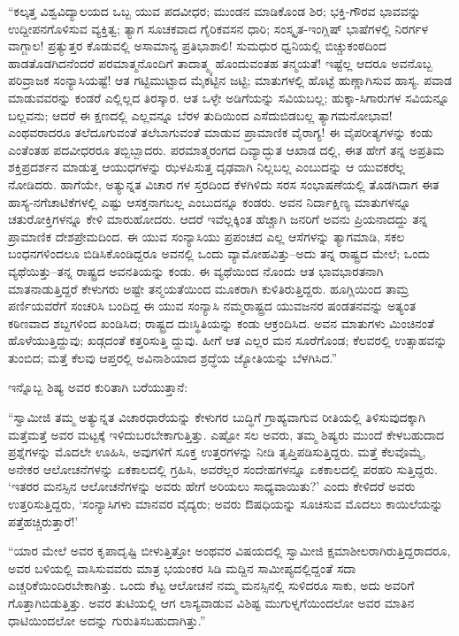 “ಕಲ್ಕತ್ತ ವಿಶ್ವವಿದ್ಯಾಲಯದ ಒಬ್ಬ ಯುವ ಪದವೀಧರ; ಮುಂಡನ ಮಾಡಿಕೊಂಡ ಶಿರ; ಭಕ್ತಿ-ಗೌರವ ಭಾವವನ್ನು ಉದ್ದೀಪನಗೊಳಿಸುವ ವ್ಯಕ್ತಿತ್ವ; ತ್ಯಾಗ ಸೂಚಕವಾದ ಗೈರಿಕವಸನ ಧಾರಿ; ಸಂಸ್ಕೃತ-ಇಂಗ್ಲಿಷ್ ಭಾಷೆಗಳಲ್ಲಿ ನಿರರ್ಗಳ ವಾಗ್ಜಾಲ! ಪ್ರತ್ಯುತ್ತರ ಕೊಡುವಲ್ಲಿ ಅಸಾಮಾನ್ಯ ಪ್ರತಿಭಾಶಾಲಿ! ಸುಮಧುರ ಧ್ವನಿಯಲ್ಲಿ ಬಿಚ್ಚುಕಂಠದಿಂದ ಹಾಡತೊಡಗಿದನೆಂದರೆ ಪರಮಾತ್ಮನೊಂದಿಗೆ ತಾದಾತ್ಮ್ಯ ಹೊಂದುವಂತಹ ತನ್ಮಯತೆ! ಇಷ್ಟೆಲ್ಲ ಆದರೂ ಅವನೊಬ್ಬ ಪರಿವ್ರಾಜಕ ಸಂನ್ಯಾಸಿಯಷ್ಟೆ! ಆತ ಗಟ್ಟಿಮುಟ್ಟಾದ ಮೈಕಟ್ಟಿನ ಜಟ್ಟಿ; ಮಾತುಗಳಲ್ಲಿ ಹೊಟ್ಟೆ ಹುಣ್ಣಾಗಿಸುವ ಹಾಸ್ಯ. ಪವಾಡ ಮಾಡುವವರನ್ನು ಕಂಡರೆ ಎಲ್ಲಿಲ್ಲದ ತಿರಸ್ಕಾರ. ಆತ ಒಳ್ಳೇ ಅಡಿಗೆಯನ್ನು ಸವಿಯಬಲ್ಲ; ಹುಕ್ಕಾ-ಸಿಗಾರುಗಳ ಸವಿಯನ್ನೂ ಬಲ್ಲವನು; ಆದರೆ ಈ ಕ್ಷಣದಲ್ಲಿ ಎಲ್ಲವನ್ನೂ ಬೆರಳ ತುದಿಯಿಂದ ಎಸೆದುಬಿಡಬಲ್ಲ ತ್ಯಾಗಮನೋಭಾವ! ಎಂಥವರಾದರೂ ತಲೆದೂಗುವಂತೆ ತಲೆಬಾಗುವಂತೆ ಮಾಡುವ ಪ್ರಾಮಾಣಿಕ ವೈರಾಗ್ಯ! ಈ ವೈಪರೀತ್ಯಗಳನ್ನು ಕಂಡು ಎಂತೆಂತಹ ಪದವೀಧರರೂ ತಬ್ಬಿಬ್ಬಾದರು. ಪರಮಾತ್ಮರಂಗದ ದಿವ್ಯಾದ್ಭುತ ಆಖಾಡ ದಲ್ಲಿ, ಈತ ಹೇಗೆ ತನ್ನ ಅಪ್ರತಿಮ ಶಕ್ತಿಪ್ರದರ್ಶನ ಮಾಡುತ್ತ ಆಯುಧಗಳನ್ನು ಝಳಪಿಸುತ್ತ ದೃಢವಾಗಿ ನಿಲ್ಲಬಲ್ಲ ಎಂಬುದನ್ನು ಆ ಯುವಕರೆಲ್ಲ ನೋಡಿದರು. ಹಾಗೆಯೇ, ಅತ್ಯುನ್ನತ ವಿಚಾರ ಗಳ ಸ್ತರದಿಂದ ಕೆಳಗಿಳಿದು ಸರಸ ಸಂಭಾಷಣೆಯಲ್ಲಿ ತೊಡಗಿದಾಗ ಈತ ಹಾಸ್ಯ-ನಗೆಚಾಟಿಕೆಗಳಲ್ಲಿ ಎಷ್ಟು ಆಸಕ್ತನಾಗಬಲ್ಲ ಎಂಬುದನ್ನೂ ಕಂಡರು. ಅವನ ನಿರ್ದಾಕ್ಷಿಣ್ಯ ಮಾತುಗಳನ್ನೂ ಚತುರೋಕ್ತಿಗಳನ್ನೂ ಕೇಳಿ ಮಾರುಹೋದರು. ಆದರೆ ಇವೆಲ್ಲಕ್ಕಿಂತ ಹೆಚ್ಚಾಗಿ ಜನರಿಗೆ ಅವನು ಪ್ರಿಯನಾದದ್ದು ತನ್ನ ಪ್ರಾಮಾಣಿಕ ದೇಶಪ್ರೇಮದಿಂದ. ಈ ಯುವ ಸಂನ್ಯಾಸಿಯು ಪ್ರಪಂಚದ ಎಲ್ಲ ಆಸೆಗಳನ್ನು ತ್ಯಾಗಮಾಡಿ, ಸಕಲ ಬಂಧನಗಳಿಂದಲೂ ಬಿಡಿಸಿಕೊಂಡಿದ್ದರೂ ಅವನಲ್ಲಿ ಒಂದು ವ್ಯಾಮೋಹವಿತ್ತು–ಅದು ತನ್ನ ರಾಷ್ಟ್ರದ ಮೇಲೆ; ಒಂದು ವ್ಯಥೆಯಿತ್ತು–ತನ್ನ ರಾಷ್ಟ್ರದ ಅವನತಿಯನ್ನು ಕಂಡು. ಈ ವ್ಯಥೆಯಿಂದ ನೊಂದು ಆತ ಭಾವಭಾರತನಾಗಿ ಮಾತನಾಡುತ್ತಿದ್ದರೆ ಕೇಳುಗರು ಅಷ್ಟೇ ತನ್ಮಯತೆಯಿಂದ ಮೂಕರಾಗಿ ಕುಳಿತಿರುತ್ತಿದ್ದರು. ಹೂಗ್ಲಿಯಿಂದ ತಾಮ್ರ ಪರ್ಣಿಯವರೆಗೆ ಸಂಚರಿಸಿ ಬಂದಿದ್ದ ಈ ಯುವ ಸಂನ್ಯಾಸಿ ನಮ್ಮರಾಷ್ಟ್ರದ ಯುವಜನರ ಷಂಡತನವನ್ನು ಅತ್ಯಂತ ಕಠಿಣವಾದ ಶಬ್ದಗಳಿಂದ ಖಂಡಿಸಿದ; ರಾಷ್ಟ್ರದ ದುಃಸ್ಥಿತಿಯನ್ನು ಕಂಡು ಆಕ್ರಂದಿಸಿದ. ಅವನ ಮಾತುಗಳು ಮಿಂಚಿನಂತೆ ಹೊಳೆಯುತ್ತಿದ್ದುವು; ಖಡ್ಗದಂತೆ ಕತ್ತರಿಸುತ್ತಿ ದ್ದುವು. ಹೀಗೆ ಆತ ಎಲ್ಲರ ಮನ ಸೂರೆಗೊಂಡ; ಕೆಲವರಲ್ಲಿ ಉತ್ಸಾಹವನ್ನು ತುಂಬಿದ; ಮತ್ತೆ ಕೆಲವು ಆಪ್ತರಲ್ಲಿ ಅವಿನಾಶಿಯಾದ ಶ್ರದ್ಧೆಯ ಜ್ಯೋತಿಯನ್ನು ಬೆಳಗಿಸಿದ.”

ಇನ್ನೊಬ್ಬ ಶಿಷ್ಯ ಅವರ ಕುರಿತಾಗಿ ಬರೆಯುತ್ತಾನೆ:

“ಸ್ವಾಮೀಜಿ ತಮ್ಮ ಅತ್ಯುನ್ನತ ವಿಚಾರಧಾರೆಯನ್ನು ಕೇಳುಗರ ಬುದ್ಧಿಗೆ ಗ್ರಾಹ್ಯವಾಗುವ ರೀತಿಯಲ್ಲಿ ತಿಳಿಸುವುದಕ್ಕಾಗಿ ಮತ್ತೆಮತ್ತೆ ಅವರ ಮಟ್ಟಕ್ಕೆ ಇಳಿದುಬರಬೇಕಾಗುತ್ತಿತ್ತು. ಎಷ್ಟೋ ಸಲ ಅವರು, ತಮ್ಮ ಶಿಷ್ಯರು ಮುಂದೆ ಕೇಳಬಹುದಾದ ಪ್ರಶ್ನೆಗಳನ್ನು ಮೊದಲೇ ಊಹಿಸಿ, ಅವುಗಳಿಗೆ ಸೂಕ್ತ ಉತ್ತರಗಳನ್ನು ನೀಡಿ ತೃಪ್ತಿಪಡಿಸುತ್ತಿದ್ದರು. ಮತ್ತೆ ಕೆಲವೊಮ್ಮೆ, ಅನೇಕರ ಆಲೋಚನೆಗಳನ್ನು ಏಕಕಾಲದಲ್ಲಿ ಗ್ರಹಿಸಿ, ಅವರೆಲ್ಲರ ಸಂದೇಹಗಳನ್ನೂ ಏಕಕಾಲದಲ್ಲಿ ಪರಹರಿ ಸುತ್ತಿದ್ದರು. ‘ಇತರರ ಮನಸ್ಸಿನ ಆಲೋಚನೆಗಳನ್ನು ಅವರು ಹೇಗೆ ಅರಿಯಲು ಸಾಧ್ಯವಾಯಿತು?’ ಎಂದು ಕೇಳಿದರೆ ಅವರು ಉತ್ತರಿಸುತ್ತಿದ್ದರು, ‘ಸಂನ್ಯಾಸಿಗಳು ಮಾನವರ ವೈದ್ಯರು; ಅವರು ಔಷಧಿಯನ್ನು ಸೂಚಿಸುವ ಮೊದಲು ಕಾಯಿಲೆಯನ್ನು ಪತ್ತೆಹಚ್ಚಿರುತ್ತಾರೆ!’

“ಯಾರ ಮೇಲೆ ಅವರ ಕೃಪಾದೃಷ್ಟಿ ಬೀಳುತ್ತಿತ್ತೋ ಅಂಥವರ ವಿಷಯದಲ್ಲಿ ಸ್ವಾಮೀಜಿ ಕ್ಷಮಾಶೀಲರಾಗಿರುತ್ತಿದ್ದರಾದರೂ, ಅವರ ಬಳಿಯಲ್ಲಿ ವಾಸಿಸುವವರು ಮಾತ್ರ ಭಯಂಕರ ಸಿಡಿ ಮದ್ದಿನ ಸಾಮೀಪ್ಯದಲ್ಲಿದ್ದಂತೆ ಸದಾ ಎಚ್ಚರಿಕೆಯಿಂದಿರಬೇಕಾಗಿತ್ತು. ಒಂದು ಕೆಟ್ಟ ಆಲೋಚನೆ ನಮ್ಮ ಮನಸ್ಸಿನಲ್ಲಿ ಸುಳಿದರೂ ಸಾಕು, ಅದು ಅವರಿಗೆ ಗೊತ್ತಾಗಿಬಿಡುತ್ತಿತ್ತು. ಅವರ ತುಟಿಯಲ್ಲಿ ಆಗ ಲಾಸ್ಯವಾಡುವ ವಿಶಿಷ್ಟ ಮುಗುಳ್ನಗೆಯಿಂದಲೋ ಅವರ ಮಾತಿನ ಧಾಟಿಯಿಂದಲೋ ಅದನ್ನು ಗುರುತಿಸಬಹುದಾಗಿತ್ತು.”

